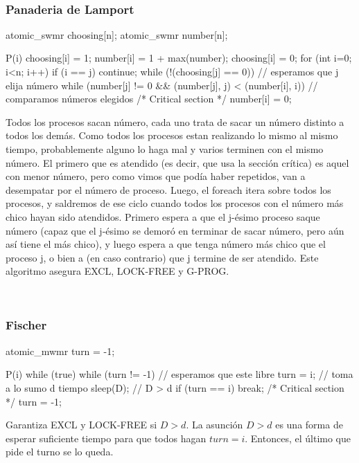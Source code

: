 \documentclass{article}
\begin{document}
~

\subsubsection{Panaderia de Lamport}

\begin{code}
 atomic_swmr choosing[n];
 atomic_swmr number[n];
 
 P(i) {
    choosing[i] = 1;
    number[i] = 1 + max(number);
    choosing[i] = 0;
    for (int i=0; i<n; i++) {
        if (i == j)
            continue;
        while (!(choosing[j] == 0)) {}           // esperamos que j elija número
        while (number[j] != 0 &&
            (number[j], j) < (number[i], i)) {}  // comparamos números elegidos
    }
    /* Critical section */
    number[i] = 0;
 }
 
\end{code}

Todos los procesos sacan número, cada uno trata de sacar un número distinto a todos los demás. Como todos los procesos estan realizando lo mismo al mismo tiempo, probablemente alguno lo haga mal y varios terminen con el mismo número. El primero que es atendido (es decir, que usa la sección crítica) es aquel con menor número, pero como vimos que podía haber repetidos, van a desempatar por el número de proceso. Luego, el foreach itera sobre todos los procesos, y saldremos de ese ciclo cuando todos los procesos con el número más chico hayan sido atendidos. Primero espera a que el j-ésimo proceso saque número (capaz que el j-ésimo se demoró en terminar de sacar número, pero aún así tiene el más chico), y luego espera a que tenga número más chico que el proceso j, o bien a (en caso contrario) que j termine de ser atendido. Este algoritmo asegura EXCL, LOCK-FREE y G-PROG.

~

\subsubsection{Fischer}
\begin{code}
 atomic_mwmr turn = -1;
 
 P(i) {
    while (true) {
        while (turn != -1) {} // esperamos que este libre
        turn = i;             // toma a lo sumo d tiempo
        sleep(D);             // D > d
        if (turn == i)
            break;
    }
    /* Critical section */
    turn = -1;
 }
\end{code}

Garantiza EXCL y LOCK-FREE si $D > d$. La asunción $D > d$ es una forma de esperar suficiente tiempo para que todos hagan $turn = i$. Entonces, el último que pide el turno se lo queda.
\end{document}
